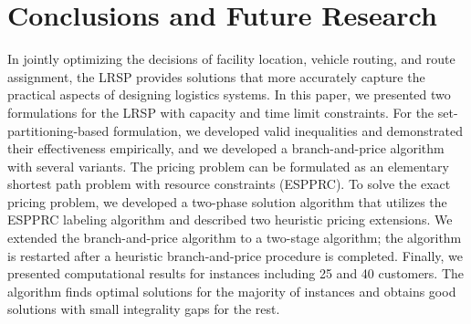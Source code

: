 \documentclass[11pt]{article}
\newcommand{\rtbpapercomment}[1]{\noindent \textcolor{red}{\bf RTB: #1 } }
\begin{document}

\clearpage
\section{Conclusions and Future Research}
\label{sec:conclusion}
In jointly optimizing the decisions of facility location, vehicle routing, and
route assignment, the LRSP provides solutions that more accurately capture 
the practical aspects of designing logistics systems.
In this paper, we presented 
two formulations  for the LRSP with capacity and time limit constraints.  For the 
set-partitioning-based formulation, we developed valid inequalities and 
demonstrated their effectiveness empirically, and we developed a branch-and-price 
algorithm with several variants.  The pricing problem can be formulated as an elementary 
shortest path problem with resource constraints (ESPPRC).  
To solve the exact pricing problem, we developed a two-phase solution algorithm that utilizes 
the ESPPRC labeling algorithm and described two heuristic pricing extensions.
We extended the branch-and-price algorithm to a two-stage
algorithm; the algorithm is restarted after a heuristic 
branch-and-price procedure is completed. Finally, we presented computational results for instances 
including 25 and 40 customers. The algorithm finds optimal solutions for the 
majority of instances and obtains good solutions with small integrality gaps
for the rest.
\end{document}
